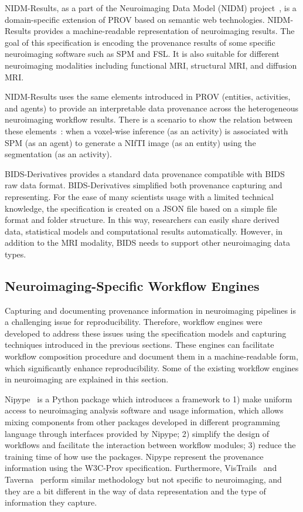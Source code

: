 NIDM-Results, as a part of the Neuroimaging 
Data Model (NIDM) project~\cite{nidm-results}, is a domain-specific 
extension of PROV based on semantic web technologies. NIDM-Results 
provides a machine-readable representation of neuroimaging results. The 
goal of this specification is encoding the provenance results of some 
specific neuroimaging software such as SPM and FSL. It is also
suitable for different neuroimaging modalities including functional 
MRI, structural MRI, and diffusion MRI.

NIDM-Results uses the same elements introduced in PROV (entities, 
activities, and agents) to provide an interpretable data provenance 
across the heterogeneous neuroimaging workflow results. There is a 
scenario to show the relation between these 
elements~\cite{maumet2016sharing}: when a voxel-wise inference (as an 
activity) is associated with SPM (as an agent) to generate a NIfTI 
image (as an entity) using the segmentation (as an activity).

BIDS-Derivatives provides a standard data provenance compatible with 
BIDS~\cite{gorgolewski2016brain} raw data format. BIDS-Derivatives 
simplified both provenance capturing and representing. For the ease of 
many scientists usage with a limited technical knowledge, the 
specification is created on a JSON file based on a simple file format 
and folder structure. In this way, researchers can easily share derived 
data, statistical models and computational results automatically. 
However, in addition to the MRI modality, BIDS needs to support other 
neuroimaging data types.


\subsection{Neuroimaging-Specific Workflow Engines} 

Capturing and documenting provenance information in neuroimaging 
pipelines is a challenging issue for reproducibility. 
Therefore, workflow engines were developed to address these issues using 
the specification models and capturing techniques introduced in the 
previous sections. These engines can facilitate workflow composition 
procedure and document them in a machine-readable form, which 
significantly enhance reproducibility. Some of the existing workflow 
engines in neuroimaging are explained in this section. 

Nipype~\cite{gorgolewski2011nipype} is a Python package which 
introduces a framework to 1) make uniform access to neuroimaging 
analysis software and usage information, which allows mixing components 
from other packages developed in different programming language through 
interfaces provided by Nipype; 2) simplify the design of workflows and 
facilitate the interaction between workflow modules; 3) reduce the 
training time of how use the packages. Nipype represent the provenance 
information using the W3C-Prov specification. Furthermore, 
VisTrails~\cite{callahan2006vistrails} and 
Taverna~\cite{oinn2004taverna} perform similar methodology but not 
specific to neuroimaging, and they are a bit different in the way of 
data representation and the type of information they capture. 

